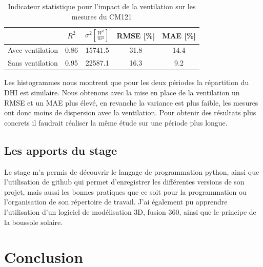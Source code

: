 \documentclass[12pt,a4paper]{article}
\begin{document}
\begin{flushleft}
\begin{table}[H]
\begin{center}
\begin{tabular}{ |c|c|c|c|c| } 
 \hline
  & $R^2$ & $\sigma ^2 [\frac{W^2}{m^4}]$ & RMSE [\%] & MAE [\%] \\ 
  \hline
 Avec ventilation & 0.86 & 15741.5 & 31.8 & 14.4\\ 
 \hline
 Sans ventilation & 0.95 & 22587.1 & 16.3 & 9.2 \\ 
 \hline
\end{tabular}
\caption{Indicateur statistique pour l'impact de la ventilation sur les mesures du CM121}
\end{center}
\end{table}


Les histogrammes nous montrent que pour les deux périodes la répartition du DHI est similaire.
Nous obtenons avec la mise en place de la ventilation un RMSE et un MAE plus élevé, en revanche la variance est plus faible, les mesures ont donc moins de dispersion avec la ventilation. Pour obtenir des résultats plus concrets il faudrait réaliser la même étude sur une période plus longue.

\subsection{Les apports du stage}

Le stage m'a permis de découvrir le langage de programmation python, ainsi que l'utilisation de github qui permet d'enregistrer les différentes versions de son projet, mais aussi les bonnes pratiques que ce soit pour la programmation ou l'organisation de son répertoire de travail. J'ai également pu apprendre l'utilisation d'un logiciel de modélisation 3D, fusion 360, ainsi que le principe de la boussole solaire.


\section{Conclusion}


\end{flushleft}
\end{document}

